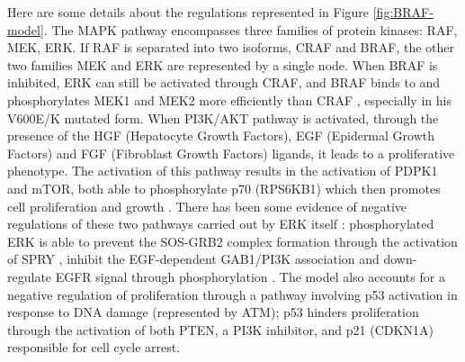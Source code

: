 \documentclass[a4paper,12pt,twoside,onecolumn,openright,final,oldfontcommands]{memoir}
\begin{document}
Here are some details about the regulations represented in Figure
\ref{fig:BRAF-model}. The MAPK pathway encompasses three families of
protein kinases: RAF, MEK, ERK. If RAF is separated into two isoforms,
CRAF and BRAF, the other two families MEK and ERK are represented by a
single node. When BRAF is inhibited, ERK can still be activated through
CRAF, and BRAF binds to and phosphorylates MEK1 and MEK2 more
efficiently than CRAF \citep{wellbrock2004raf}, especially in his
V600E/K mutated form. When PI3K/AKT pathway is activated, through the
presence of the HGF (Hepatocyte Growth Factors), EGF (Epidermal Growth
Factors) and FGF (Fibroblast Growth Factors) ligands, it leads to a
proliferative phenotype. The activation of this pathway results in the
activation of PDPK1 and mTOR, both able to phosphorylate p70 (RPS6KB1)
which then promotes cell proliferation and growth
\citep{uniprot2019uniprot}. There has been some evidence of negative
regulations of these two pathways carried out by ERK itself
\citep{lake2016negative}: phosphorylated ERK is able to prevent the
SOS-GRB2 complex formation through the activation of SPRY
\citep{edwin2009intermolecular}, inhibit the EGF-dependent GAB1/PI3K
association \citep{lehr2004identification} and down-regulate EGFR signal
through phosphorylation \citep{lake2016negative}. The model also
accounts for a negative regulation of proliferation through a pathway
involving p53 activation in response to DNA damage (represented by ATM);
p53 hinders proliferation through the activation of both PTEN, a PI3K
inhibitor, and p21 (CDKN1A) responsible for cell cycle arrest.
\end{document}
